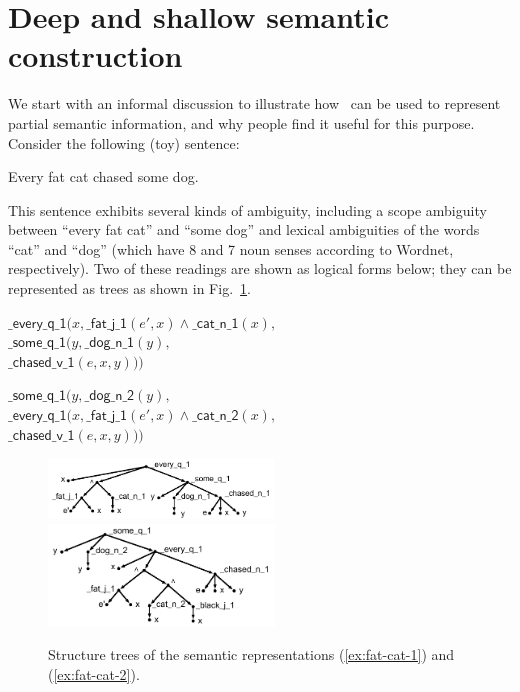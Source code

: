 \newcommand{\sem}[1]{\mathsf{#1}}
\newcommand{\sempred}[1]{\mathrm{#1}}

\section{Deep and shallow semantic construction}
\label{sec:motivation}

We start with an informal discussion to 
illustrate how \rmrs\ can be used to represent partial
semantic information, and why people find it useful for this purpose.
Consider the following (toy) sentence:
\begin{examples}
  \item Every fat cat chased some dog.
\end{examples}

This sentence exhibits several kinds of ambiguity, including a scope
ambiguity between ``every fat cat'' and ``some dog'' and lexical
ambiguities of the words ``cat'' and ``dog'' (which have 8 and 7 noun
senses according to Wordnet, respectively).  Two of these readings are
shown as logical forms below; they can be represented as trees as
shown in Fig.~\ref{fig:1}.  

\begin{examples}
\item $\sem{\_every\_q\_1}(x, \sem{\_fat\_j\_1}(e',x) \wedge
    \sem{\_cat\_n\_1}(x),$\\
\hspace*{0.1in} $\sem{\_some\_q\_1}(y, \sem{\_dog\_n\_1}(y),$\\
\hspace*{0.2in}$\sem{\_chased\_v\_1}(e,x,y)))$
\label{ex:fat-cat-1}
\item $\sem{\_some\_q\_1}(y, \sem{\_dog\_n\_2}(y),$\\
\hspace*{0.1in}$\sem{\_every\_q\_1}(x, \sem{\_fat\_j\_1}(e',x) \wedge
    \sem{\_cat\_n\_2}(x), $\\
\hspace*{0.2in}$\sem{\_chased\_v\_1}(e,x,y)))$
\label{ex:fat-cat-2}
\end{examples}


\begin{figure}[t]
\includegraphics[width=6cm]{pic-cat-chased-dog}
\hspace{1cm}
\includegraphics[width=6cm]{pic-cat-chased-dog-2}
\caption{Structure trees of the semantic representations (\ref{ex:fat-cat-1}) and
  (\ref{ex:fat-cat-2}). \label{fig:1}}
\end{figure}


